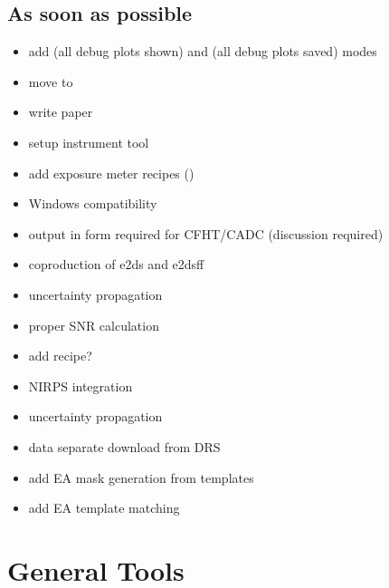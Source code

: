 \documentclass[a4paper,10pt,english]{report}
\begin{document}
\subsection{As soon as possible}
\label{\detokenize{user/general/todo:as-soon-as-possible}}\begin{itemize}
\item {} 
add  (all debug plots shown) and  (all debug plots saved) modes

\item {} 
move  to 

\item {} 
write  paper

\item {} 
setup instrument tool

\item {} 
add exposure meter recipes ()

\item {} 
Windows compatibility

\item {} 
output in form required for CFHT/CADC (discussion required)

\item {} 
co\sphinxhyphen{}production of e2ds and e2dsff

\item {} 
uncertainty propagation

\item {} 
proper SNR calculation

\item {} 
add  recipe?

\item {} 
NIRPS integration

\item {} 
uncertainty propagation

\item {} 
data separate download from DRS

\item {} 
add EA mask generation from templates

\item {} 
add EA template matching

\end{itemize}


\section{General Tools}
\label{\detokenize{user/general/tools_default:general-tools}}\label{\detokenize{user/general/tools_default:tools-default}}\label{\detokenize{user/general/tools_default::doc}}
\end{document}
